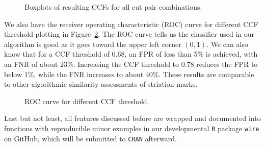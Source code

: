 \documentclass[
  authoryear,
  preprint,
  5p,
  twocolumn]{elsarticle}
\begin{document}
\begin{figure}


\caption{\label{fig-ccf-boxplot}Boxplots of resulting CCFs for all cut
pair combinations.}

\end{figure}%

We also have the receiver operating characteristic (ROC) curve for
different CCF threshold plotting in Figure~\ref{fig-ccf-ROC}. The ROC
curve tells us the classifier used in our algorithm is good as it goes
toward the upper left corner \((0, 1)\). We can also know that for a CCF
threshold of 0.68, an FPR of less than 5\% is achieved, with an FNR of
about 23\%. Increasing the CCF threshold to 0.78 reduces the FPR to
below 1\%, while the FNR increases to about 40\%. These results are
comparable to other algorithmic similarity assessments of striation
marks.

\begin{figure}


\caption{\label{fig-ccf-ROC}ROC curve for different CCF threshold.}

\end{figure}%

Last but not least, all features discussed before are wrapped and
documented into functions with reproducible minor examples in our
developmental \texttt{R} package \texttt{wire} on GitHub, which will be
submitted to \texttt{CRAN} afterward.


\renewcommand\refname{References}
  
\end{document}
